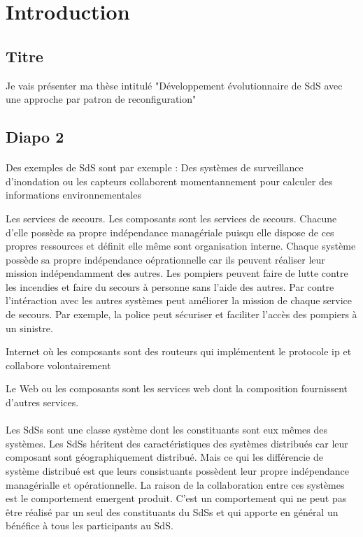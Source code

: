 \section{Introduction}

\subsection{Titre}
Je vais présenter ma thèse intitulé "Développement évolutionnaire de
SdS avec une approche par patron de reconfiguration" 

\subsection{Diapo 2}
\paragraph{}
Des exemples de SdS sont par exemple :
Des systèmes de surveillance d'inondation ou les capteurs collaborent
momentannement pour calculer des informations environnementales

Les services de secours. Les composants sont les services de secours.
Chacune d'elle possède sa propre indépendance managériale puisqu elle
dispose de ces propres ressources et définit elle même sont
organisation interne. Chaque système possède sa propre indépendance
oéprationnelle car ils peuvent réaliser leur mission indépendamment
des autres. Les pompiers peuvent faire de lutte contre les incendies
et faire du secours à personne sans l'aide des autres. Par contre
l'intéraction avec les autres systèmes peut améliorer la mission de 
chaque service de secours. Par exemple, la police peut sécuriser et
faciliter l'accès des pompiers à un sinistre.

Internet où les composants sont des routeurs qui implémentent le
protocole ip et collabore volontairement 

Le Web ou les composants sont les services web dont la composition
fournissent d'autres services. 
\paragraph{}
Les SdSs sont une
classe système dont les constituants sont eux mêmes des
systèmes. Les SdSs héritent des caractéristiques des systèmes
distribués car
leur composant sont géographiquement distribué. Mais ce qui les
différencie de système distribué est que leurs consistuants possèdent
leur propre
indépendance managérialle et opérationnelle. La raison de la
collaboration entre ces systèmes est le comportement emergent produit.
C'est un comportement qui ne peut pas être réalisé par un seul des
constituants du SdSs et qui apporte en général un bénéfice à tous les
participants au SdS.


